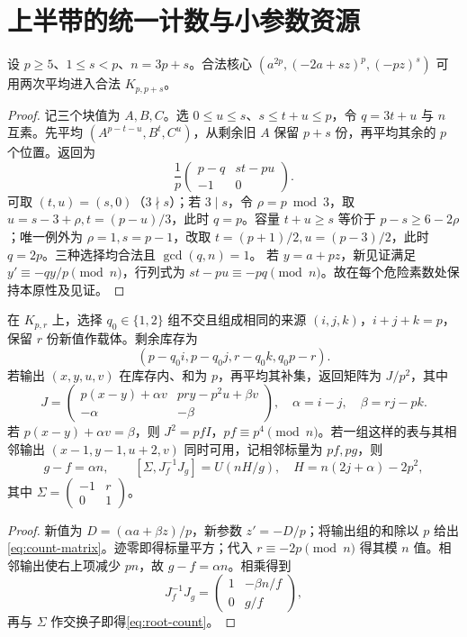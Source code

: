 \section{上半带的统一计数与小参数资源}\label{app:upper}
\begin{lemma}\label{lem:shape-change}
设 $p\ge5$、$1\le s<p$、$n=3p+s$。合法核心 $(a^{2p},(-2a+sz)^p,(-pz)^s)$ 可用两次平均进入合法 $K_{p,p+s}$。
\end{lemma}
\begin{proof}
记三个块值为 $A,B,C$。选 $0\le u\le s$、$s\le t+u\le p$，令 $q=3t+u$ 与 $n$ 互素。先平均 $(A^{p-t-u},B^t,C^u)$，从剩余旧 $A$ 保留 $p+s$ 份，再平均其余的 $p$ 个位置。返回为
\[
\frac1p\begin{pmatrix}p-q&st-pu\\-1&0\end{pmatrix}.
\]
可取 $(t,u)=(s,0)$（$3\nmid s$）；若 $3\mid s$，令 $\rho=p\bmod3$，取 $u=s-3+\rho,t=(p-u)/3$，此时 $q=p$。容量 $t+u\ge s$ 等价于 $p-s\ge6-2\rho$；唯一例外为 $\rho=1,s=p-1$，改取 $t=(p+1)/2,u=(p-3)/2$，此时 $q=2p$。三种选择均合法且 $\gcd(q,n)=1$。
若 $y=a+pz$，新见证满足 $y'\equiv-qy/p\pmod n$，行列式为 $st-pu\equiv-pq\pmod n$。故在每个危险素数处保持本原性及见证。
\end{proof}

\begin{lemma}\label{lem:count-interface}
在 $K_{p,r}$ 上，选择 $q_0\in\{1,2\}$ 组不交且组成相同的来源 $(i,j,k)$，$i+j+k=p$，保留 $r$ 份新值作载体。剩余库存为
\begin{equation}\label{eq:stock}
(p-q_0i,p-q_0j,r-q_0k,q_0p-r).
\end{equation}
若输出 $(x,y,u,v)$ 在库存内、和为 $p$，再平均其补集，返回矩阵为 $J/p^2$，其中
\begin{equation}\label{eq:count-matrix}
J=\begin{pmatrix}p(x-y)+\alpha v&pry-p^2u+\beta v\\-\alpha&-\beta\end{pmatrix},
\quad \alpha=i-j,\quad\beta=rj-pk.
\end{equation}
若 $p(x-y)+\alpha v=\beta$，则 $J^2=pfI$，$pf\equiv p^4\pmod n$。若一组这样的表与其相邻输出 $(x-1,y-1,u+2,v)$ 同时可用，记相邻标量为 $pf,pg$，则
\begin{equation}\label{eq:root-count}
g-f=\alpha n,\qquad
[\Sigma,J_f^{-1}J_g]=U(nH/g),\quad H=n(2j+\alpha)-2p^2,
\end{equation}
其中 $\Sigma=\left(\begin{smallmatrix}-1&r\\0&1\end{smallmatrix}\right)$。
\end{lemma}
\begin{proof}
新值为 $D=(\alpha a+\beta z)/p$，新参数 $z'=-D/p$；将输出组的和除以 $p$ 给出\eqref{eq:count-matrix}。迹零即得标量平方；代入 $r\equiv-2p\pmod n$ 得其模 $n$ 值。相邻输出使右上项减少 $pn$，故 $g-f=\alpha n$。相乘得到
\[
J_f^{-1}J_g=\begin{pmatrix}1&-\beta n/f\\0&g/f\end{pmatrix},
\]
再与 $\Sigma$ 作交换子即得\eqref{eq:root-count}。
\end{proof}

